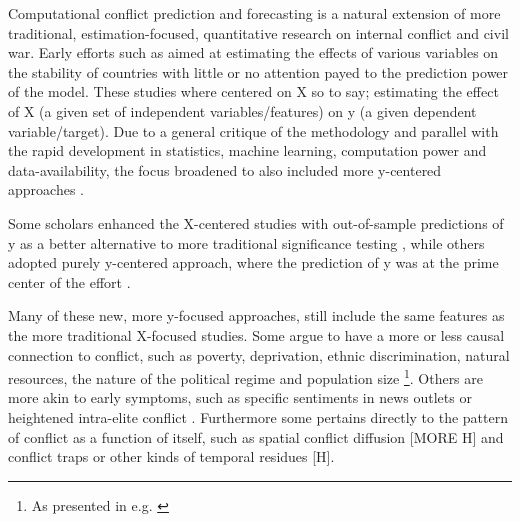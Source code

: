  \citep{King_Zeng_2001, king_zeng_2001b, Ward_Greenhill_Bakke_2010, Goldstone_2010, Schrodt_2014} 


Computational conflict prediction and forecasting is a natural extension of more traditional, estimation-focused, quantitative research on internal conflict and civil war. Early efforts such as \cite{Collier_Hoeffler_1998,Fearon_Laitin_2003,Collier_Hoeffler_2004,Hegre_Sambanis_2006} aimed at estimating the effects of various variables on the stability of countries with little or no attention payed to the prediction power of the model. These studies where centered on X so to say; estimating the effect of X (a given set of independent variables/features) on y (a given dependent variable/target). Due to a general critique of the methodology \citep{King_Zeng_2001, king_zeng_2001b, Ward_Greenhill_Bakke_2010, Goldstone_2010, Schrodt_2014} and parallel with the rapid development in statistics, machine learning, computation power and data-availability, the focus broadened to also included more y-centered approaches \citep{Goldstone_2010, perry_2013, chadefaux_2014, mueller_2016}.\par


Some scholars enhanced the X-centered studies with out-of-sample predictions of y as a better alternative to more traditional significance testing \citep{Goldstone_2010}, while others adopted purely y-centered approach, where the prediction of y was at the prime center of the effort \citep{perry_2013, chadefaux_2014, mueller_2016}.\par

Many of these new, more y-focused approaches, still include the same features as the more traditional X-focused studies. Some argue to have a more or less causal connection to conflict, such as poverty, deprivation, ethnic discrimination, natural resources, the nature of the political regime and population size \footnote{As presented in e.g. \cite{Collier_Hoeffler_1998, Fearon_Laitin_2003, Collier_Hoeffler_2004, Fearon_2004, Ross_2004, Hegre_Sambanis_2006, Goldstone_2010, Cederman_Gleditsch_Buhaug_2013}}. Others are more akin to early symptoms, such as specific sentiments in news outlets \cite{perry_2013, chadefaux_2014} or heightened intra-elite conflict \citep{Goldstone_2010}. Furthermore some pertains directly to the pattern of conflict as a function of itself, such as spatial conflict diffusion \citep{Goldstone_2010} [MORE H] and conflict traps or other kinds of temporal residues [H].\par



